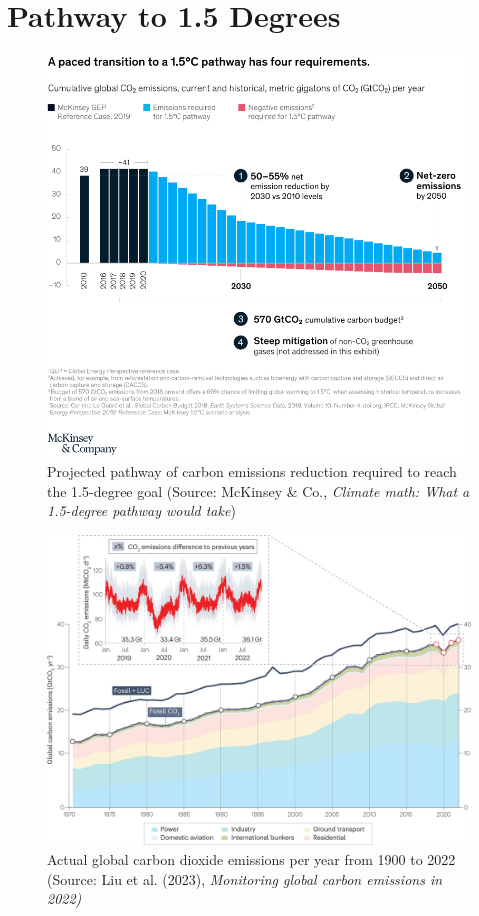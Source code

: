 \chapter{Pathway to 1.5 Degrees}
\begin{figure}[ht!]
    \includegraphics[width=\textwidth]{figures/pathway.png}
    \caption[Projected pathway of carbon emissions reduction required to reach the 1.5-degree goal]{Projected pathway of carbon emissions reduction required to reach the 1.5-degree goal (Source: McKinsey \& Co., \textit{Climate math: What a 1.5-degree pathway would take})}
\end{figure}
\begin{figure}[ht!]
    \includegraphics[width=\textwidth]{figures/emissions.png}
    \caption[Actual global carbon dioxide emissions per year from 1900 to 2022]{Actual global carbon dioxide emissions per year from 1900 to 2022 (Source: Liu et al. (2023), \textit{Monitoring global carbon emissions in 2022)}}
\end{figure}

